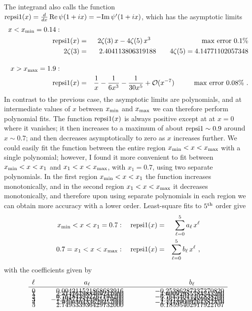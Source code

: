 \documentclass[preprint,12pt,eqsecnum,nofootinbib,amsmath,amssymb]{revtex4}
\begin{document}
The integrand also calls the function ${\rm repsi1}(x)=
\frac{d}{dx}\, {\rm Re}\, \psi(1 + i x)=- {\rm Im}\, 
\psi^\prime(1 + i x)$, which has the asymptotic limits
\begin{eqnarray}
\nonumber
  x < x_{\rm min}=0.14: \hskip1cm \\  
  {\rm repsi1}(x) &=& 2 \zeta(3)\,x
  - 4 \zeta(5)\,x^3
  \hskip2.6cm {\rm max~error~} 0.1\% 
\\ \nonumber
  2 \zeta(3) &=& 2.404113806319188
  \hskip0.7cm 
  4\zeta(5) = 4.14771102057348
\\[10pt]
\nonumber
  x > x_{\rm max}=1.9 : \hskip1cm \\  
  {\rm repsi1}(x) &=& \frac{1}{x} - \frac{1}{6 x^3} -
  \frac{1}{30 x^5} + {\cal O}(x^{-7})
  \hskip1cm {\rm max~error~} 0.08\%   \ .
\end{eqnarray}
In contrast to the previous case, the asymptotic limits
are polynomials, and at intermediate values of $x$ between 
$x_{\rm min}$ and $x_{\rm max}$  we can therefore perform 
polynomial fits. The function 
${\rm repsi1}(x)$ is always positive except at at $x=0$
where it vanishes; it then increases to a maximum of about 
${\rm repsi1}\sim 0.9$ around $x \sim 0.7$; and then decreases 
asymptotically to zero as $x$ increases further. We could 
easily fit the function between the entire region $x_{\rm min} 
< x < x_{\rm max}$ with a single polynomial; however, I found 
it more convenient to fit between $x_{\rm min}<x<x_1$ and $x_1 
< x < x_{\rm max}$, with $x_1=0.7$, using two separate polynomials. 
In the first region $x_{\rm min}<x<x_1$ the function increases 
monotonically, and in the second region $x_1 < x < x_{\rm max}$ 
it decreases monotonically, and therefore upon using separate 
polynomials in each region we can obtain more accuracy with 
a lower order. Least-square fits to $5^{\rm th}$ order give
\begin{eqnarray}
  x_{\rm min} < x < x_1=0.7 : ~~~
  {\rm repsi1}(x) &=& \sum_{\ell=0}^5 a_\ell\, x^\ell
\\
 0.7= x_1 < x < x_{\rm max}: ~~~
  {\rm repsi1}(x) &=& \sum_{\ell=0}^5 b_\ell\, x^\ell \ ,
\end{eqnarray}
with the coefficients given by 
\begin{eqnarray}
  \begin{array}{lrr}
  \ell~~~~ & \hfill a_\ell \hfill & \hskip3cm b_\ell \hskip1.5cm  \\ \hline
  0    &  0.004211521868683916   &  -0.25386287337370820 \\[-8pt]
  1    &  2.314767988469241000   &   4.60092985583543200 \\[-8pt]
  2    &  0.761843932767193200   &  -6.76154044407838200 \\[-8pt]
  3    & -7.498711815965575000   &   4.46723854889984100 \\[-8pt]
  4    &  7.940030433629257000   &  -1.44439009761387350 \\[-8pt]
  5    &  2.749533936429732000   &   0.18595402917922707
  \end{array}  
\end{eqnarray}
\end{document}
